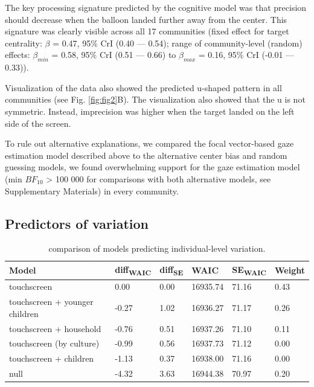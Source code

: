 \documentclass[
  man,floatsintext]{apa7}
\begin{document}
The key processing signature predicted by the cognitive model was that precision should decrease when the balloon landed further away from the center. This signature was clearly visible across all 17 communities (fixed effect for target centrality: \(\beta\) = 0.47, 95\% CrI (0.40 --- 0.54); range of community-level (random) effects: \(\beta_{min}\) = 0.58, 95\% CrI (0.51 --- 0.66) to \(\beta_{max}\) = 0.16, 95\% CrI (-0.01 --- 0.33)).

Visualization of the data also showed the predicted u-shaped pattern in all communities (see Fig. \ref{fig:fig2}B). The visualization also showed that the u is not symmetric. Instead, imprecision was higher when the target landed on the left side of the screen.

To rule out alternative explanations, we compared the focal vector-based gaze estimation model described above to the alternative center bias and random guessing models, we found overwhelming support for the gaze estimation model (min \(BF_{10}\) \textgreater{} 100 000 for comparisons with both alternative models, see Supplementary Materials) in every community.

\hypertarget{predictors-of-variation-1}{%
\subsection{Predictors of variation}\label{predictors-of-variation-1}}

\begin{table}

\caption{\label{tab:predcomptable}comparison of models predicting individual-level variation.}
\centering
\begin{tabular}[t]{llllll}
\toprule
Model & diff\textsubscript{WAIC} & diff\textsubscript{SE} & WAIC & SE\textsubscript{WAIC} & Weight\\
\midrule
touchscreen & 0.00 & 0.00 & 16935.74 & 71.16 & 0.43\\
touchscreen + younger children & -0.27 & 1.02 & 16936.27 & 71.17 & 0.26\\
touchscreen + household & -0.76 & 0.51 & 16937.26 & 71.10 & 0.11\\
touchscreen (by culture) & -0.99 & 0.56 & 16937.73 & 71.12 & 0.00\\
touchscreen + children & -1.13 & 0.37 & 16938.00 & 71.16 & 0.00\\
\addlinespace
null & -4.32 & 3.63 & 16944.38 & 70.97 & 0.20\\
\bottomrule
\end{tabular}
\end{table}
\end{document}
